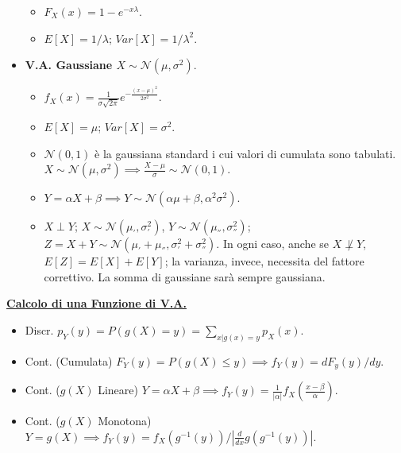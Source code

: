 \documentclass{article}
\begin{document}
\begin{multicols*}{3}
\begin{itemize}
\begin{itemize}
        \item $F_{X}(x)=1-e^{-x\lambda}$.
        \item $E[X]=1/\lambda$; $Var[X]=1/\lambda^{2}$.
    \end{itemize}
    \item \textbf{V.A. Gaussiane $X\sim\mathcal{N}(\mu,\sigma^{2})$}.
    \begin{itemize}
        \item $f_{X}(x)=\frac{1}{\sigma\sqrt{2\pi}}e^{-\frac{(x-\mu)^{2}}{2\sigma^{2}}}$.
        \item $E[X]=\mu$; $Var[X]=\sigma^{2}$.
        \item $\mathcal{N}(0,1)$ è la gaussiana standard i cui valori di cumulata sono tabulati. $X\sim\mathcal{N}(\mu, \sigma^{2})\implies \frac{X-\mu}{\sigma}\sim\mathcal{N}(0,1)$.
        \item $Y=\alpha X+\beta\implies Y\sim\mathcal{N}(\alpha\mu +\beta,\alpha^{2}\sigma^{2})$.
        \item $X\perp Y$; $X\sim\mathcal{N}(\mu_{'}, \sigma_{'}^{2})$, $Y\sim\mathcal{N}(\mu_{''}, \sigma_{''}^{2})$; $Z=X+Y\sim\mathcal{N}(\mu_{'}+\mu_{''}, \sigma_{'}^{2}+\sigma_{''}^{2})$. In ogni caso, anche se $X\not\perp Y$, $E[Z]=E[X]+E[Y]$; la varianza, invece, necessita del fattore correttivo. La somma di gaussiane sarà sempre gaussiana.
    \end{itemize}
\end{itemize}
\textbf{\underline{Calcolo di una Funzione di V.A.}}
\begin{itemize}
    \item Discr. $p_{Y}(y)=P(g(X)=y)=\sum_{x|g(x)=y}p_{X}(x)$.
    \item Cont. (Cumulata) $F_{Y}(y)=P(g(X)\leq y)\implies f_{Y}(y)=dF_{y}(y)/dy$.
    \item Cont. ($g(X)$ Lineare) $Y=\alpha X+\beta\implies f_{Y}(y)=\frac{1}{|\alpha|}f_{X}(\frac{x-\beta}{\alpha})$.
    \item Cont. ($g(X)$ Monotona) $Y=g(X)\implies f_{Y}(y)=f_{X}(g^{-1}(y))/\left|\frac{d}{dx}g(g^{-1}(y))\right|$.
\end{itemize}

\end{multicols*}
\end{document}
